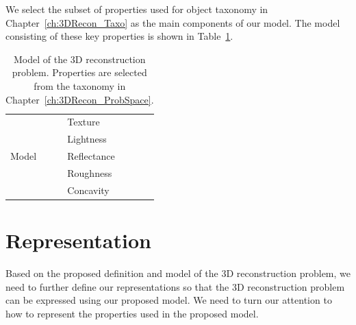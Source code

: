 We select the subset of properties used for object taxonomy in Chapter~\ref{ch:3DRecon_Taxo} as the main components of our model. The model consisting of these key properties is shown in Table~\ref{tab:3DRecon_model}.
\begin{table}[!htbp]
  \centering
  \begin{tabular}{l|l}
  \toprule
  \multirow{5}{*}{Model} & Texture\\
  & Lightness\\
  & Reflectance\\
  & Roughness\\
  & Concavity\\
  \bottomrule
  \end{tabular}
  \caption{Model of the 3D reconstruction problem. Properties are selected from the taxonomy in Chapter~\ref{ch:3DRecon_ProbSpace}.}
  \label{tab:3DRecon_model}
\end{table}



\section{Representation}
\label{sec:3DRecon_Rep}
Based on the proposed definition and model of the 3D reconstruction problem, we need to further define our representations so that the 3D reconstruction problem can be expressed using our proposed model. We need to turn our attention to how to represent the properties used in the proposed model.


